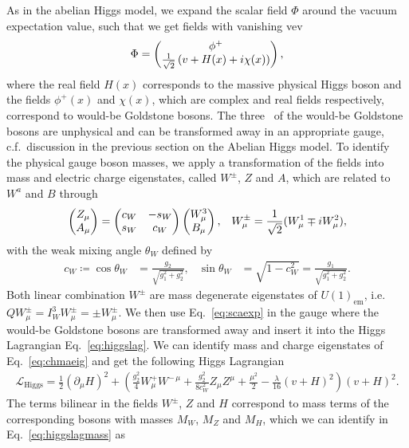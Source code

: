 As in the abelian Higgs model, we expand the scalar field $\Phi$ around the vacuum expectation
value, such that we get fields with vanishing vev
\begin{align}\label{eq:scaexp}
\Phi=\pmqty{\phi^+\\\frac{1}{\sqrt{2}}\left(v+H(x)+i\chi(x)\right)},
\end{align}
where the real field $H(x)$ corresponds to the massive physical Higgs
boson and the fields $\phi^+(x)$ and $\chi(x)$, which are complex and
real fields respectively, correspond to would-be Goldstone bosons. The three \dof~of the
would-be Goldstone bosons are unphysical and can be transformed away in an appropriate
gauge, c.f.\ discussion in the previous section on the
Abelian Higgs model. To identify the physical gauge boson masses, we apply a transformation
of the fields into mass and electric charge eigenstates, called
$W^\pm$, $Z$ and $A$, which are related to $W^a$ and $B$ through
\begin{align}\label{eq:chmaeig}
  \pmqty{Z_\mu\\A_\mu}=\pmqty{c_W & -
    s_W\\s_W & c_W}\pmqty{W_\mu^3\\B_\mu}, && W_\mu^{\pm} =
  \frac{1}{\sqrt{2}}(W_\mu^1\mp i W_\mu^2),
\end{align}
with the weak mixing angle $\theta_W$ defined by
\begin{align}
  c_W  \coloneqq \cos\theta_W  &=\frac{g_2}{\sqrt{g_1^2+g_2^2}}, & \sin\theta_W
  &=\sqrt{1-c_W^2}=\frac{g_1}{\sqrt{g_1^2+g_2^2}}.
\end{align}
Both linear combination $W^\pm$ are mass degenerate eigenstates of
$U(1)_{\text{em}}$, i.e.\ $QW_\mu^\pm= I^3_W W_\mu^\pm = \pm
W^\pm_\mu$. We then use Eq.~\eqref{eq:scaexp} in the gauge where the would-be Goldstone bosons are transformed away and insert it into the Higgs
Lagrangian Eq.~\eqref{eq:higgslag}. We can identify mass and
charge eigenstates of Eq.~\eqref{eq:chmaeig} and get the following
Higgs Lagrangian
\begin{align}\label{eq:higgslagmass}
    \mathcal{L}_{\text{Higgs}} =\frac{1}{2}(\partial_\mu
    H)^2+ \left(\frac{g_2^2}{4}W^+_\mu W^{-\,\mu}+
      \frac{g_2^2}{8c_W^2}Z_\mu Z^{\mu}+\frac{\mu^2}{2}
      -\frac{\lambda}{16}(v+H)^2 \right) (v+H)^2.
\end{align}
The terms bilinear in the fields $W^\pm$, $Z$ and $H$ correspond to
mass terms of the corresponding bosons with masses $M_W$, $M_Z$ and
$M_H$, which we can identify in Eq.~\eqref{eq:higgslagmass} as
